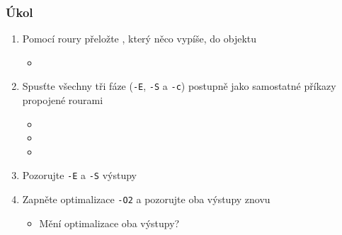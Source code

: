 \begin{frame}
  \frametitle{Úkol}

  \begin{enumerate}
    \item Pomocí roury přeložte , který něco vypíše, do objektu
    \begin{itemize}
      \item {}
    \end{itemize}

    \item Spusťte všechny tři fáze (\texttt{-E}, \texttt{-S} a \texttt{-c})
      postupně jako samostatné příkazy propojené rourami
    \begin{itemize}
      \item {}
      \item {}
      \item {}
    \end{itemize}

    \item Pozorujte \texttt{-E} a \texttt{-S} výstupy
    \item Zapněte optimalizace \texttt{-O2} a pozorujte oba výstupy znovu
    \begin{itemize}
      \item Mění optimalizace oba výstupy?
    \end{itemize}
  \end{enumerate}
\end{frame}

